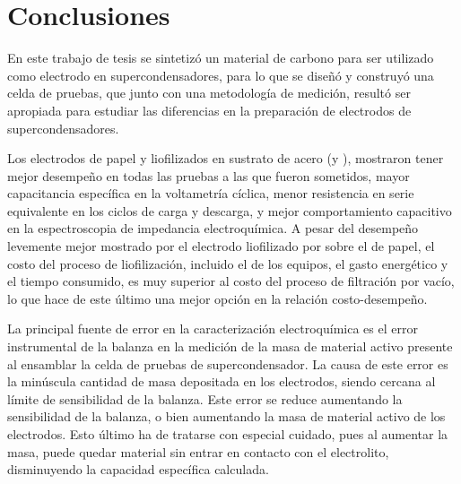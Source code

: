 \chapter*{Conclusiones}
En este trabajo de tesis se sintetizó un material de carbono para ser utilizado como electrodo en supercondensadores, para lo que se diseñó y construyó una celda de pruebas, que junto con una metodología de medición, resultó ser apropiada para estudiar las diferencias en la preparación de electrodos de supercondensadores.

Los electrodos de papel y liofilizados en sustrato de acero (\mPapelAcero y \mLiofilizadoAcero), mostraron tener mejor desempeño en todas las pruebas a las que fueron sometidos, mayor capacitancia específica en la voltametría cíclica, menor resistencia en serie equivalente en los ciclos de carga y descarga, y mejor comportamiento capacitivo en la espectroscopia de impedancia electroquímica. A pesar del desempeño levemente mejor mostrado por el electrodo liofilizado por sobre el de papel, el costo del proceso de liofilización, incluido el de los equipos, el gasto energético y el tiempo consumido, es muy superior al costo del proceso de filtración por vacío, lo que hace de este último una mejor opción en la relación costo-desempeño.

La principal fuente de error en la caracterización electroquímica es el error instrumental de la balanza en la medición de la masa de material activo presente al ensamblar la celda de pruebas de supercondensador. La causa de este error es la minúscula cantidad de masa depositada en los electrodos, siendo cercana al límite de sensibilidad de la balanza. Este error se reduce aumentando la sensibilidad de la balanza, o bien aumentando la masa de material activo de los electrodos. Esto último ha de tratarse con especial cuidado, pues al aumentar la masa, puede quedar material sin entrar en contacto con el electrolito, disminuyendo la capacidad específica calculada. 